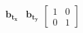 \documentclass[preview]{standalone}
\begin{document}
\begin{align*}
\begin{array}{c}\begin{matrix}\mathbf{b}_{\mathbf{t_x}} & \mathbf{b}_{\mathbf{t_y}}\end{matrix}\begin{bmatrix} 1 & 0 \\0 & 1 \end{bmatrix} \end{array}
\end{align*}
\end{document}
